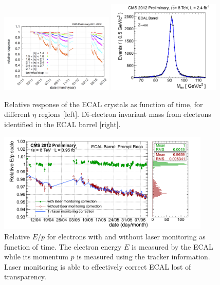\begin{figure}[!Hhtbp]
  \begin{center}
    \includegraphics[width=0.48\textwidth]{figs/laser_monitoring_histories_2011-2012.png}
    \includegraphics[width=0.48\textwidth]{figs/_500___2012_zee_eb_golden.png}
    \caption{Relative response of the ECAL crystals as function of time, for different $\eta$ regions [left]. Di-electron invariant mass from electrons identified in the ECAL barrel [right].}
    \label{fig:RelaResp}
  \end{center}
\end{figure}

\begin{figure}[!Hhtbp]
  \begin{center}
    \includegraphics[width=0.9\textwidth]{figs/EoverP_history_2012.png}
    \caption{Relative $E/p$ for electrons with and without laser monitoring as function of time. The electron energy $E$ is measured by the ECAL while its momentum $p$ is measured using the tracker information. Laser monitoring is able to effectively correct ECAL lost of transparency.}
    \label{figs:RelEp}
  \end{center}
\end{figure}

